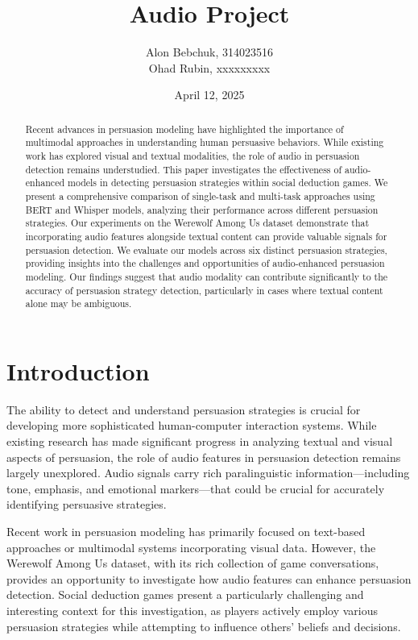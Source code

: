 \documentclass[10pt,twocolumn]{article}
\title{Audio Project}
\author{Alon Bebchuk, 314023516 \\ Ohad Rubin, xxxxxxxxx}
\date{April 12, 2025}
\begin{document}
\maketitle

\begin{abstract}
Recent advances in persuasion modeling have highlighted the importance of multimodal approaches in understanding human persuasive behaviors. While existing work has explored visual and textual modalities, the role of audio in persuasion detection remains understudied. This paper investigates the effectiveness of audio-enhanced models in detecting persuasion strategies within social deduction games. We present a comprehensive comparison of single-task and multi-task approaches using BERT and Whisper models, analyzing their performance across different persuasion strategies. Our experiments on the Werewolf Among Us dataset demonstrate that incorporating audio features alongside textual content can provide valuable signals for persuasion detection. We evaluate our models across six distinct persuasion strategies, providing insights into the challenges and opportunities of audio-enhanced persuasion modeling. Our findings suggest that audio modality can contribute significantly to the accuracy of persuasion strategy detection, particularly in cases where textual content alone may be ambiguous.
\end{abstract}

\section{Introduction}
The ability to detect and understand persuasion strategies is crucial for developing more sophisticated human-computer interaction systems. While existing research has made significant progress in analyzing textual and visual aspects of persuasion, the role of audio features in persuasion detection remains largely unexplored. Audio signals carry rich paralinguistic information—including tone, emphasis, and emotional markers—that could be crucial for accurately identifying persuasive strategies.

Recent work in persuasion modeling has primarily focused on text-based approaches or multimodal systems incorporating visual data. However, the Werewolf Among Us dataset, with its rich collection of game conversations, provides an opportunity to investigate how audio features can enhance persuasion detection. Social deduction games present a particularly challenging and interesting context for this investigation, as players actively employ various persuasion strategies while attempting to influence others' beliefs and decisions.
\end{document}
